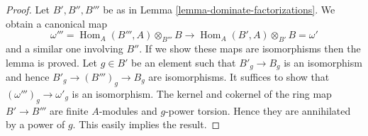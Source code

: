\documentclass[10pt,a4paper]{amsart}
\theoremstyle{plain}
\theoremstyle{definition}
\theoremstyle{remark}
\numberwithin{equation}{subsection}
\def\Hom{\mathop{\mathrm{Hom}}\nolimits}
\begin{document}
\begin{proof}
Let $B', B'', B'''$ be as in Lemma \ref{lemma-dominate-factorizations}.
We obtain a canonical map
$$
\omega''' = \Hom_A(B''', A) \otimes_{B'''} B \longrightarrow
\Hom_A(B', A) \otimes_{B'} B = \omega'
$$
and a similar one involving $B''$. If we show these maps are isomorphisms
then the lemma is proved. Let $g \in B'$ be an element such that
$B'_g \to B_g$ is an isomorphism and hence $B'_g \to (B''')_g \to B_g$
are isomorphisms. It suffices to show that $(\omega''')_g \to \omega'_g$
is an isomorphism. The kernel and cokernel of the ring map $B' \to B'''$
are finite $A$-modules and $g$-power torsion.
Hence they are annihilated by a power of $g$.
This easily implies the result.
\end{proof}
\end{document}
